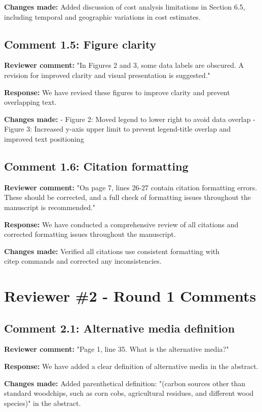 \documentclass[12pt,a4paper]{article}
\begin{document}
\textbf{Changes made:} Added discussion of cost analysis limitations in Section 6.5, including temporal and geographic variations in cost estimates.

\subsection{Comment 1.5: Figure clarity}
\textbf{Reviewer comment:} "In Figures 2 and 3, some data labels are obscured. A revision for improved clarity and visual presentation is suggested."

\textbf{Response:} We have revised these figures to improve clarity and prevent overlapping text.

\textbf{Changes made:} 
- Figure 2: Moved legend to lower right to avoid data overlap
- Figure 3: Increased y-axis upper limit to prevent legend-title overlap and improved text positioning

\subsection{Comment 1.6: Citation formatting}
\textbf{Reviewer comment:} "On page 7, lines 26-27 contain citation formatting errors. These should be corrected, and a full check of formatting issues throughout the manuscript is recommended."

\textbf{Response:} We have conducted a comprehensive review of all citations and corrected formatting issues throughout the manuscript.

\textbf{Changes made:} Verified all citations use consistent formatting with \\citep{} commands and corrected any inconsistencies.

\section{Reviewer \#2 - Round 1 Comments}

\subsection{Comment 2.1: Alternative media definition}
\textbf{Reviewer comment:} "Page 1, line 35. What is the alternative media?"

\textbf{Response:} We have added a clear definition of alternative media in the abstract.

\textbf{Changes made:} Added parenthetical definition: "(carbon sources other than standard woodchips, such as corn cobs, agricultural residues, and different wood species)" in the abstract.
\end{document}
